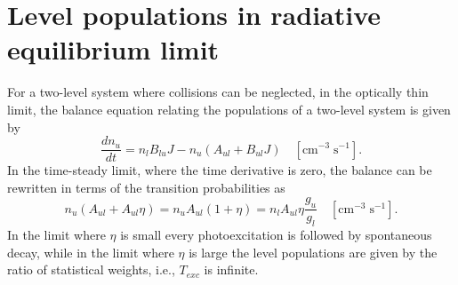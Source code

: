 \section{Level populations in radiative equilibrium limit}

For a two-level system where collisions can be neglected, in the optically
thin limit, the balance equation relating the populations of a two-level
system is given by
\begin{equation}
\frac{{d{n_u}}}{{dt}} = {n_l}{B_{lu}}J - {n_u}\left( {{A_{ul}} + {B_{ul}}J}
\right)
\quad  [\mathrm{cm}^{-3} \;\mathrm{s}^{-1}].
\end{equation}
In the time-steady limit, where the time derivative is zero, the balance
can be rewritten in terms of the transition probabilities as
\begin{equation}
{n_u}\left( {{A_{ul}} + {A_{ul}}\eta } \right) = {n_u}{A_{ul}}\left( {1
+ \eta } \right) = {n_l}{A_{ul}}\eta \frac{{{g_u}}}{{{g_l}}}
\quad  [\mathrm{cm}^{-3} \;\mathrm{s}^{-1}].
\end{equation}
In the limit where $\eta$ is small every photoexcitation is followed by
spontaneous decay, while in the limit where $\eta$ is large the level populations
are given by the ratio of statistical weights, i.e., $T_{exc}$ is infinite.




